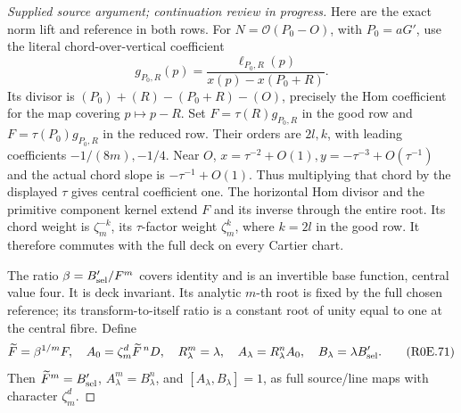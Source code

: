 \begin{proof}[Supplied source argument; continuation review in progress]
Here are the exact norm lift and reference in both rows. For
\(N=\mathcal O(P_0-O)\), with \(P_0=aG'\), use the literal
chord-over-vertical coefficient
\[
 g_{P_0,R}(p)=\frac{\ell_{P_0,R}(p)}{x(p)-x(P_0+R)}.
 \tag{R0E.70}
\]
Its divisor is \((P_0)+(R)-(P_0+R)-(O)\), precisely the Hom
coefficient for the map covering \(p\mapsto p-R\). Set
\(F=\tau(R)g_{P_0,R}\) in the good row and
\(F=\tau(P_0)g_{P_0,R}\) in the reduced row. Their orders are
\(2l,k\), with leading coefficients \(-1/(8m),-1/4\).
Near \(O\), \(x=\tau^{-2}+O(1),y=-\tau^{-3}+O(\tau^{-1})\)
and the actual chord slope is \(-\tau^{-1}+O(1)\). Thus multiplying
that chord by the displayed \(\tau\) gives central coefficient
one. The horizontal Hom divisor and the primitive component kernel
extend \(F\) and its inverse through the entire root. Its chord
weight is \(\zeta_m^{-k}\), its \(\tau\)-factor weight
\(\zeta_m^k\), where \(k=2l\) in the good row. It therefore
commutes with the full deck on every Cartier chart.

The ratio \(\beta=B'_{\rm sel}/F^m\) covers identity and is an
invertible base function, central value four. It is deck invariant.
Its analytic \(m\)-th root is fixed by the full chosen reference;
its transform-to-itself ratio is a constant root of unity equal to
one at the central fibre. Define
\[
 \widetilde F=\beta^{1/m}F,\quad
 A_0=\zeta_m^d\widetilde F^{\,n}D,\quad
 R_\lambda^m=\lambda,\quad A_\lambda=R_\lambda^n A_0,\quad
 B_\lambda=\lambda B'_{\rm sel}.
 \tag{R0E.71}
\]
Then \(\widetilde F^m=B'_{\rm sel}\),
\(A_\lambda^m=B_\lambda^n\), and
\([A_\lambda,B_\lambda]=1\), as full source/line maps with
character \(\zeta_m^d\).


\end{proof}

